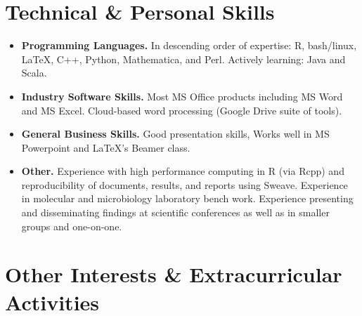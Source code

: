 \documentclass[11pt,letterpaper,sans]{moderncv}        %
\begin{document}
\section{Technical \& Personal Skills}


\begin{itemize}

\item \textbf{Programming Languages.} In descending order of expertise: R, bash/linux, \LaTeX, C++, Python, Mathematica, and Perl. Actively learning: Java and Scala. 


\item \textbf{Industry Software Skills.} Most MS Office products including MS Word and MS Excel. Cloud-based word processing (Google Drive suite of tools).


\item \textbf{General Business Skills.} Good presentation skills, Works well in MS Powerpoint and \LaTeX's Beamer class. 


\item \textbf{Other.} Experience with high performance computing in R (via Rcpp) and reproducibility of documents, results, and reports using Sweave.  Experience in molecular and microbiology laboratory bench work. Experience presenting and disseminating findings at scientific conferences as well as in smaller groups and one-on-one. 

\end{itemize}

\section{Other Interests \& Extracurricular Activities}

\end{document}
